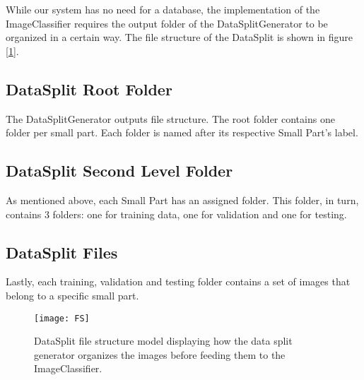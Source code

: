 While our system has no need for a database, the implementation of the ImageClassifier requires the output folder of the DataSplitGenerator to be organized in a certain way. The file structure of the DataSplit is shown in figure [\ref{fig:FS}].

\subsection{DataSplit Root Folder}
The DataSplitGenerator outputs file structure. The root folder contains one folder per small part. Each folder is named after its respective Small Part's label.

\subsection{DataSplit Second Level Folder}
As mentioned above, each Small Part has an assigned folder. This folder, in turn, contains 3 folders: one for training data, one for validation and one for testing.

\subsection{DataSplit Files}
Lastly, each training, validation and testing folder contains a set of images that belong to a specific small part.


\begin{figure}[h]
\centering
  \texttt{[image: FS]}
\caption{DataSplit file structure model displaying how the data split generator organizes the images before feeding them to the ImageClassifier.}
\label{fig:FS}
\end{figure}
